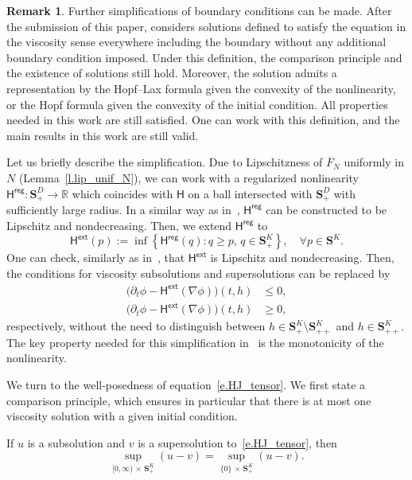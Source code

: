 \documentclass[10pt]{amsart}
\theoremstyle{definition}\newtheorem{defi}[theo]{Definition}\newtheorem{rema}[theo]{Remark}\newtheorem{exam}[theo]{Example}\newtheorem{exem}[theo]{Example}\newtheorem{nota}[theo]{Notation}
\newcommand{\R}{\mathbb{R}}
\renewcommand{\S}{\mathbf{S}}
\renewcommand{\H}{\mathsf{H}}
\newcommand{\reg}{\mathsf{reg}}
\newcommand{\extl}{\mathsf{ext}}
\renewcommand{\leq}{\leqslant}
\renewcommand{\geq}{\geqslant}
\renewcommand{\bar}{\overline}
\let\oldforall\forall
\renewcommand*{\forall}{\mathrel{\oldforall}}
\begin{document}
\begin{rema}\label{r.boundary}
Further simplifications of boundary conditions can be made. After the submission of this paper, \cite{chen2022hamilton} considers solutions defined to satisfy the equation in the viscosity sense everywhere including the boundary without any additional boundary condition imposed. Under this definition, the comparison principle and the existence of solutions still hold. Moreover, the solution admits a representation by the Hopf--Lax formula given the convexity of the nonlinearity, or the Hopf formula given the convexity of the initial condition. All properties needed in this work are still satisfied. One can work with this definition, and the main results in this work are still valid.

Let us briefly describe the simplification. Due to Lipschitzness of $\bar F_N$ uniformly in $N$ (Lemma~\ref{l.lip_unif_N}), we can work with a regularized nonlinearity $\H^{\reg}:\S^D_+\to\R$ which coincides with $\H$ on a ball intersected with $\S^D_+$ with sufficiently large radius. In a similar way as in~\cite[Lemma~4.2]{chen2022hamilton}, $\H^{\reg}$ can be constructed to be Lipschitz and nondecreasing. Then, we extend $\H^{\reg}$ to
\[
\H^{\extl}(p):=\inf\left\{\H^{\reg}(q):q\geq p,\, q\in\S^K_+\right\},\quad\forall p\in\S^K.
\]
One can check, similarly as in~\cite[Lemma~4.4]{chen2022hamilton}, that $\H^{\extl}$ is Lipschitz and nondecreasing. Then, the conditions for viscosity subsolutions and supersolutions can be replaced by
\begin{align*}
\big(\partial_t \phi - \H^{\extl}(\nabla\phi)\big)(t,h) &\leq 0,
\\
\big(\partial_t \phi - \H^{\extl}(\nabla\phi)\big)(t,h) &\geq 0,
\end{align*}
respectively, without the need to distinguish between $h\in \S^K_+\setminus\S^K_{++}$ and $h\in \S^K_{++}$. The key property needed for this simplification in~\cite{chen2022hamilton} is the monotonicity of the nonlinearity.
\end{rema}



We turn to the well-posedness of equation~\eqref{e.HJ_tensor}. We first state a comparison principle, which ensures in particular that there is at most one viscosity solution with a given initial condition.
\begin{prop}\label{p.comp}
If $u$ is a {subsolution} and $v$ is a {supersolution} to~\eqref{e.HJ_tensor}, then
\[
\sup_{[0,\infty)\,\times\,\S^K_+}(u-v)=\sup_{\{0\}\,\times\,\S^K_+}(u-v).
\]
\end{prop}
\end{document}
